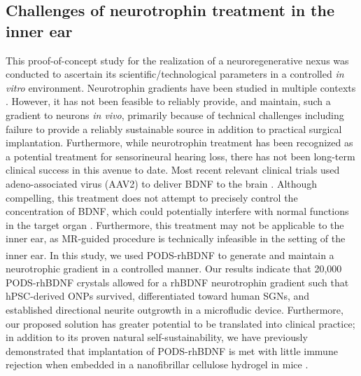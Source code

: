 \documentclass[review]{elsarticle}
\begin{document}
\subsection{Challenges of neurotrophin treatment in the inner ear}  
This proof-of-concept study for the realization of a neuroregenerative nexus was conducted to ascertain its scientific/technological parameters in a controlled \textit{in vitro} environment. Neurotrophin gradients have been studied in multiple contexts \cite{Keefe2017,Awad2015,Hollis2011}. However, it has not been feasible to reliably provide, and maintain, such a gradient to neurons \textit{in vivo}, primarily because of technical challenges including failure to provide a reliably sustainable source in addition to practical surgical implantation. Furthermore, while neurotrophin treatment has been recognized as a potential treatment for sensorineural hearing loss, there has not been long-term clinical success in this avenue to date. Most recent relevant clinical trials used adeno-associated virus (AAV2) to deliver BDNF to the brain \cite{Nagahara2018}. Although compelling, this treatment does not attempt to precisely control the concentration of BDNF, which could potentially interfere with normal functions in the target organ \cite{Croll1999}. Furthermore, this treatment may not be applicable to the inner ear, as MR-guided procedure is technically infeasible in the setting of the inner ear. In this study, we used PODS\textsuperscript{\textregistered}-rhBDNF to generate and maintain a neurotrophic gradient in a controlled manner. Our results indicate that 20,000 PODS-rhBDNF crystals allowed for a rhBDNF neurotrophin gradient such that hPSC-derived ONPs survived, differentiated toward human SGNs, and established directional neurite outgrowth in a microfludic device. Furthermore, our proposed solution has greater potential to be translated into clinical practice; in addition to its proven natural self-sustainability, we have previously demonstrated that implantation of PODS-rhBDNF is met with little immune rejection when embedded in a nanofibrillar cellulose hydrogel in mice \cite{Chang2020}.
\end{document}

